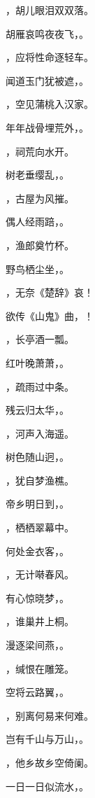 \documentclass[12pt, a4paper, addpoints, answers]{exam}
\begin{document}
\begin{questions}
\question[3] \fillin，胡儿眼泪双双落。

\question[3] 胡雁哀鸣夜夜飞，\fillin。

\question[3] \fillin，应将性命逐轻车。

\question[3] 闻道玉门犹被遮，\fillin。

\question[3] \fillin，空见蒲桃入汉家。

\question[3] 年年战骨埋荒外，\fillin。

\question[3] \fillin，祠荒向水开。

\question[3] 树老垂缨乱，\fillin。

\question[3] \fillin，古屋为风摧。

\question[3] 偶人经雨踣，\fillin。

\question[3] \fillin，渔郎奠竹杯。

\question[3] 野鸟栖尘坐，\fillin。

\question[3] \fillin，无奈《楚辞》哀！

\question[3] 欲传《山鬼》曲，\fillin！

\question[3] \fillin，长亭酒一瓢。

\question[3] 红叶晚萧萧，\fillin。

\question[3] \fillin，疏雨过中条。

\question[3] 残云归太华，\fillin。

\question[3] \fillin，河声入海遥。

\question[3] 树色随山迥，\fillin。

\question[3] \fillin，犹自梦渔樵。

\question[3] 帝乡明日到，\fillin。

\question[3] \fillin，栖栖翠幕中。

\question[3] 何处金衣客，\fillin。

\question[3] \fillin，无计啭春风。

\question[3] 有心惊晓梦，\fillin。

\question[3] \fillin，谁巢井上桐。

\question[3] 漫逐梁间燕，\fillin。

\question[3] \fillin，缄恨在雕笼。

\question[3] 空将云路翼，\fillin。

\question[3] \fillin，别离何易来何难。

\question[3] 岂有千山与万山，\fillin。

\question[3] \fillin，他乡故乡空倚阑。

\question[3] 一日一日似流水，\fillin。


\end{questions}
\end{document}
